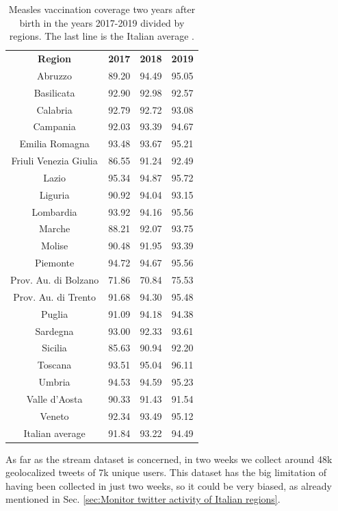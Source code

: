 \documentclass[prb,twocolumn,9pt]{revtex4-1}
\begin{document}
 \begin{table}[b]
    \begin{minipage}[l]{1.0\columnwidth}
    \centering
        \begin{tabular*}{\linewidth}{@{\extracolsep{\fill}} c c c c}
       \textbf{Region}	&	\textbf{2017}	&	\textbf{2018}	&	\textbf{2019}	\\
 \colrule							
Abruzzo	&	89.20	&	94.49	&	95.05	\\
Basilicata	&	92.90	&	92.98	&	92.57	\\
Calabria	&	92.79	&	92.72	&	93.08	\\
Campania	&	92.03	&	93.39	&	94.67	\\
Emilia Romagna	&	93.48	&	93.67	&	95.21	\\
Friuli Venezia Giulia	&	86.55	&	91.24	&	92.49	\\
Lazio	&	95.34	&	94.87	&	95.72	\\
Liguria	&	90.92	&	94.04	&	93.15	\\
Lombardia	&	93.92	&	94.16	&	95.56	\\
Marche	&	88.21	&	92.07	&	93.75	\\
Molise	&	90.48	&	91.95	&	93.39	\\
Piemonte	&	94.72	&	94.67	&	95.56	\\
Prov. Au. di Bolzano	&	71.86	&	70.84	&	75.53	\\
Prov. Au. di Trento	&	91.68	&	94.30	&	95.48	\\
Puglia	&	91.09	&	94.18	&	94.38	\\
Sardegna	&	93.00	&	92.33	&	93.61	\\
Sicilia	&	85.63	&	90.94	&	92.20	\\
Toscana	&	93.51	&	95.04	&	96.11	\\
Umbria	&	94.53	&	94.59	&	95.23	\\
Valle d'Aosta	&	90.33	&	91.43	&	91.54	\\
Veneto	&	92.34	&	93.49	&	95.12	\\
Italian average & 91.84 & 93.22 & 94.49 \\
        \end{tabular*}
    \caption{Measles vaccination coverage two years after birth in the years 2017-2019 divided by regions. The last line is the Italian average \cite{ministerosalute}.  }
    \label{tab:vaxcoverage}
    \end{minipage}
    \end{table}
 
As far as the stream dataset is concerned, in two weeks we collect around 48k geolocalized tweets of 7k unique users. This dataset has the big limitation of having been collected in just two weeks, so it could be very biased, as already mentioned in Sec. \ref{sec:Monitor twitter activity of Italian regions}.
\end{document}
